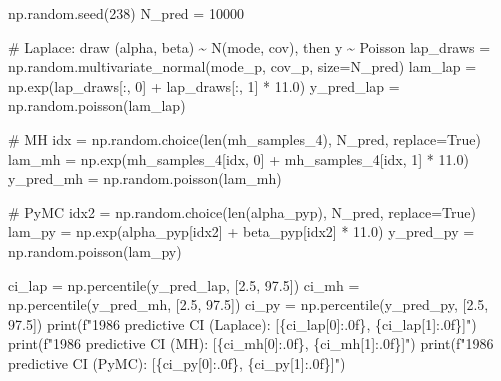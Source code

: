 \documentclass[
  letterpaper,
  DIV=11,
  numbers=noendperiod]{scrartcl}
\newenvironment{Shaded}{\begin{snugshade}}{\end{snugshade}}
\newcommand{\BuiltInTok}[1]{\textcolor[rgb]{0.00,0.23,0.31}{#1}}
\newcommand{\CommentTok}[1]{\textcolor[rgb]{0.37,0.37,0.37}{#1}}
\newcommand{\DecValTok}[1]{\textcolor[rgb]{0.68,0.00,0.00}{#1}}
\newcommand{\FloatTok}[1]{\textcolor[rgb]{0.68,0.00,0.00}{#1}}
\newcommand{\NormalTok}[1]{\textcolor[rgb]{0.00,0.23,0.31}{#1}}
\newcommand{\OperatorTok}[1]{\textcolor[rgb]{0.37,0.37,0.37}{#1}}
\newcommand{\SpecialCharTok}[1]{\textcolor[rgb]{0.37,0.37,0.37}{#1}}
\newcommand{\SpecialStringTok}[1]{\textcolor[rgb]{0.13,0.47,0.30}{#1}}
\newcommand{\VariableTok}[1]{\textcolor[rgb]{0.07,0.07,0.07}{#1}}
\begin{document}
\begin{Shaded}
\begin{Highlighting}[]
\NormalTok{np.random.seed(}\DecValTok{238}\NormalTok{)}
\NormalTok{N\_pred }\OperatorTok{=} \DecValTok{10000}

\CommentTok{\# Laplace: draw (alpha, beta) \textasciitilde{} N(mode, cov), then y \textasciitilde{} Poisson}
\NormalTok{lap\_draws }\OperatorTok{=}\NormalTok{ np.random.multivariate\_normal(mode\_p, cov\_p, size}\OperatorTok{=}\NormalTok{N\_pred)}
\NormalTok{lam\_lap }\OperatorTok{=}\NormalTok{ np.exp(lap\_draws[:, }\DecValTok{0}\NormalTok{] }\OperatorTok{+}\NormalTok{ lap\_draws[:, }\DecValTok{1}\NormalTok{] }\OperatorTok{*} \FloatTok{11.0}\NormalTok{)}
\NormalTok{y\_pred\_lap }\OperatorTok{=}\NormalTok{ np.random.poisson(lam\_lap)}

\CommentTok{\# MH}
\NormalTok{idx }\OperatorTok{=}\NormalTok{ np.random.choice(}\BuiltInTok{len}\NormalTok{(mh\_samples\_4), N\_pred, replace}\OperatorTok{=}\VariableTok{True}\NormalTok{)}
\NormalTok{lam\_mh }\OperatorTok{=}\NormalTok{ np.exp(mh\_samples\_4[idx, }\DecValTok{0}\NormalTok{] }\OperatorTok{+}\NormalTok{ mh\_samples\_4[idx, }\DecValTok{1}\NormalTok{] }\OperatorTok{*} \FloatTok{11.0}\NormalTok{)}
\NormalTok{y\_pred\_mh }\OperatorTok{=}\NormalTok{ np.random.poisson(lam\_mh)}

\CommentTok{\# PyMC}
\NormalTok{idx2 }\OperatorTok{=}\NormalTok{ np.random.choice(}\BuiltInTok{len}\NormalTok{(alpha\_pyp), N\_pred, replace}\OperatorTok{=}\VariableTok{True}\NormalTok{)}
\NormalTok{lam\_py }\OperatorTok{=}\NormalTok{ np.exp(alpha\_pyp[idx2] }\OperatorTok{+}\NormalTok{ beta\_pyp[idx2] }\OperatorTok{*} \FloatTok{11.0}\NormalTok{)}
\NormalTok{y\_pred\_py }\OperatorTok{=}\NormalTok{ np.random.poisson(lam\_py)}

\NormalTok{ci\_lap }\OperatorTok{=}\NormalTok{ np.percentile(y\_pred\_lap, [}\FloatTok{2.5}\NormalTok{, }\FloatTok{97.5}\NormalTok{])}
\NormalTok{ci\_mh  }\OperatorTok{=}\NormalTok{ np.percentile(y\_pred\_mh,  [}\FloatTok{2.5}\NormalTok{, }\FloatTok{97.5}\NormalTok{])}
\NormalTok{ci\_py  }\OperatorTok{=}\NormalTok{ np.percentile(y\_pred\_py,  [}\FloatTok{2.5}\NormalTok{, }\FloatTok{97.5}\NormalTok{])}
\BuiltInTok{print}\NormalTok{(}\SpecialStringTok{f"1986 predictive CI (Laplace): [}\SpecialCharTok{\{}\NormalTok{ci\_lap[}\DecValTok{0}\NormalTok{]}\SpecialCharTok{:.0f\}}\SpecialStringTok{, }\SpecialCharTok{\{}\NormalTok{ci\_lap[}\DecValTok{1}\NormalTok{]}\SpecialCharTok{:.0f\}}\SpecialStringTok{]"}\NormalTok{)}
\BuiltInTok{print}\NormalTok{(}\SpecialStringTok{f"1986 predictive CI (MH):      [}\SpecialCharTok{\{}\NormalTok{ci\_mh[}\DecValTok{0}\NormalTok{]}\SpecialCharTok{:.0f\}}\SpecialStringTok{, }\SpecialCharTok{\{}\NormalTok{ci\_mh[}\DecValTok{1}\NormalTok{]}\SpecialCharTok{:.0f\}}\SpecialStringTok{]"}\NormalTok{)}
\BuiltInTok{print}\NormalTok{(}\SpecialStringTok{f"1986 predictive CI (PyMC):    [}\SpecialCharTok{\{}\NormalTok{ci\_py[}\DecValTok{0}\NormalTok{]}\SpecialCharTok{:.0f\}}\SpecialStringTok{, }\SpecialCharTok{\{}\NormalTok{ci\_py[}\DecValTok{1}\NormalTok{]}\SpecialCharTok{:.0f\}}\SpecialStringTok{]"}\NormalTok{)}


\end{Highlighting}
\end{Shaded}
\end{document}
